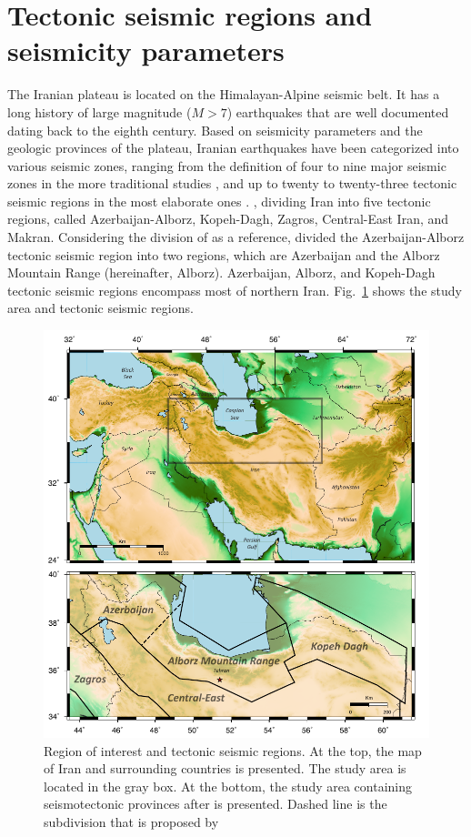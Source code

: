 \section{Tectonic seismic regions and seismicity parameters}
\noindent
The Iranian plateau is located on the Himalayan-Alpine seismic belt. It has a long history of large magnitude ($M>7$) earthquakes that are well documented dating back to the eighth century. Based on seismicity parameters and the geologic provinces of the plateau, Iranian earthquakes have been categorized into various seismic zones, ranging from the definition of four to nine major seismic zones in the more traditional studies \citep[e.g.,][]{Stocklin1968,Takin1972,Berberian1976}, and up to twenty to twenty-three tectonic seismic regions in the most elaborate ones \citep[e.g.,][]{Nowroozi1976,Tavakoli1999}. \citet{Mirzaei1998},  dividing Iran into five tectonic regions, called Azerbaijan-Alborz, Kopeh-Dagh, Zagros, Central-East Iran, and Makran. Considering the division of  \citet{Mirzaei1998} as a reference,  \citet{Karimiparidari2013}  divided the Azerbaijan-Alborz tectonic seismic region into two regions, which are Azerbaijan and the Alborz Mountain Range (hereinafter, Alborz). Azerbaijan, Alborz, and Kopeh-Dagh tectonic seismic regions encompass most of northern Iran.  Fig.~\ref{fig:study_region} shows the study area and tectonic seismic regions. \\
 
\begin{figure} [ht]
\centering
\includegraphics[scale=1]{figures/pdf/Figure01.pdf} 
\caption{Region of interest and tectonic seismic regions. At the top, the map of Iran and surrounding countries is presented. The study area is located in the gray box. At the bottom, the study area containing seismotectonic provinces after \citet{Mirzaei1998} is presented. Dashed line is the subdivision that is proposed by \citet{Karimiparidari2013}}
\label{fig:study_region}
\end{figure}
  
